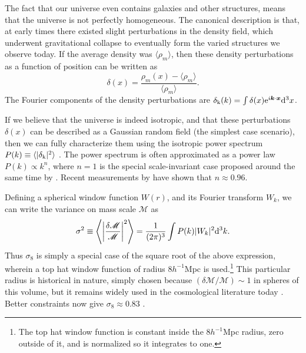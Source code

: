 The fact that our universe even contains galaxies and other structures, means that the universe is not perfectly homogeneous. The canonical description is that, at early times there existed slight perturbations in the density field, which underwent gravitational collapse to eventually form the varied structures we observe today. If the average density was $\langle \rho_m \rangle$, then these density perturbations as a function of position can be written as
\begin{equation}
\delta(x) = \frac{\rho_m(x) - \langle \rho_m \rangle}{\langle \rho_m \rangle}.
\end{equation}
The Fourier components of the density perturbations are $\delta_{\rm k}(k) = \int \delta(x) {\rm e}^{i {\bm k} \cdot {\bm x}}{\rm d}^3x$. 

If we believe that the universe is indeed isotropic, and that these perturbations $\delta(x)$ can be described as a Gaussian random field (the simplest case scenario), then we can fully characterize them using the isotropic power spectrum $P(k) \equiv \langle | \delta_{\rm k} |^2 \rangle$ \citep{Kravtsov12}. The power spectrum is often approximated as a power law $P(k) \propto k^n$, where $n=1$ is the special scale-invariant case proposed around the same time by \citet{Harrison70,PeeblesYu70,Zeldovich72}. Recent measurements by \citet{PlanckXVI} have shown that $n \approx 0.96$.

Defining a spherical window function $W(r)$, and its Fourier transform $W_k$, we can write the variance on mass scale ${\mathscr M}$ as 
\begin{equation}
\sigma^2 \equiv \left\langle \left| \frac{\delta {\mathscr M}}{\mathscr M} \right|^2 \right\rangle = \frac{1}{(2\pi)^3} \int P(k) |W_k|^2 {\rm d}^3k.
\end{equation}
Thus $\sigma_8$ is simply a special case of the square root of the above expression, wherein a top hat window function of radius $8 h^{-1}$Mpc is used.\footnote{The top hat window function is constant inside the $8 h^{-1}$Mpc radius, zero outside of it, and is normalized so it integrates to one.} This particular radius is historical in nature, simply chosen because $(\delta {\mathscr M}/{\mathscr M}) \sim 1$ in spheres of this volume, but it remains widely used in the cosmological literature today \citep{Voit05}. Better constraints now give $\sigma_8 \approx 0.83$ \citep{PlanckXVI}.

